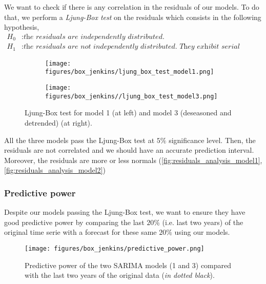 We want to check if there is any correlation in the residuals of our models. To do that, we perform a \textit{Ljung-Box test} on the residuals which consists in the following hypothesis,
\begin{align*}
	H_0&: \textit{the residuals are independently distributed.} \\
	H_1&: \textit{the residuals are not independently distributed. They exhibit serial correlation instead.}
\end{align*}


\begin{figure}[H]
	\centering
	\begin{subfigure}{0.49\textwidth}
		\centering
		\texttt{[image: figures/box\_jenkins/ljung\_box\_test\_model1.png]}
		\label{fig:ljung-box-test-model1}
	\end{subfigure}
	\begin{subfigure}{0.49\textwidth}
		\centering
		\texttt{[image: figures/box\_jenkins//ljung\_box\_test\_model3.png]}
		\label{fig:ljung-box-test-model3}
	\end{subfigure}
	\caption{Ljung-Box test for model 1 (at left) and model 3 (deseasoned and detrended) (at right).}
\end{figure}

All the three models pass the Ljung-Box test at $5\%$ significance level. Then, the residuals are not correlated and we should have an accurate prediction interval. Moreover, the residuals are more or less normals (\autoref{fig:residuals_analysis_model1}, \autoref{fig:residuals_analysis_model2})

\subsubsection{Predictive power}

Despite our models passing the Ljung-Box test, we want to ensure they have good predictive power by comparing the last $20\%$ (i.e. last two years) of the original time serie with a forecast for these same $20\%$ using our models.

\begin{figure}[H]
	\centering
	\texttt{[image: figures/box\_jenkins/predictive\_power.png]}
	\caption{Predictive power of the two SARIMA models (1 and 3) compared with the last two years of the original data (\textit{in dotted black}).}
	\label{fig:predictive-power}
\end{figure}

